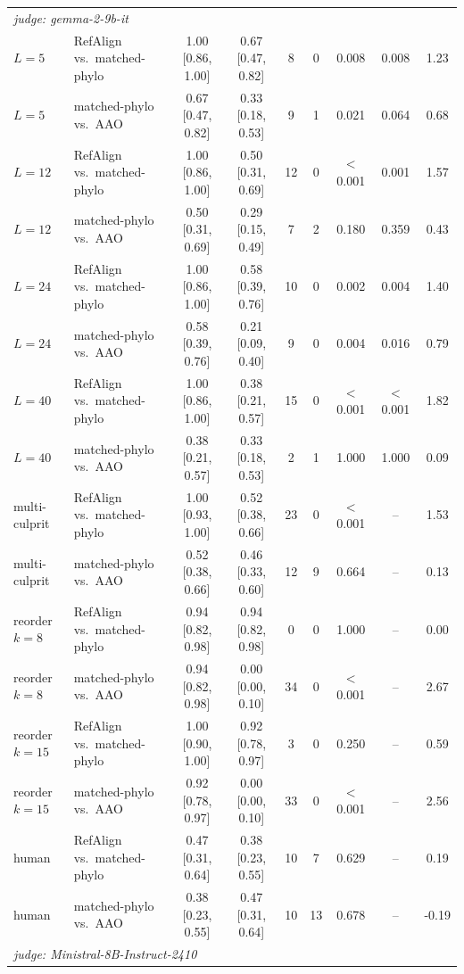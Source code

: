\begin{table}[t]
\begin{tabular}{llccccccc}
\midrule
\multicolumn{9}{l}{\emph{judge: gemma-2-9b-it}} \\
$L{=}5$ & RefAlign vs.\ matched-phylo & 1.00 [0.86, 1.00] & 0.67 [0.47, 0.82] & 8 & 0 & 0.008 & 0.008 & 1.23 \\
$L{=}5$ & matched-phylo vs.\ AAO & 0.67 [0.47, 0.82] & 0.33 [0.18, 0.53] & 9 & 1 & 0.021 & 0.064 & 0.68 \\
$L{=}12$ & RefAlign vs.\ matched-phylo & 1.00 [0.86, 1.00] & 0.50 [0.31, 0.69] & 12 & 0 & $<$0.001 & 0.001 & 1.57 \\
$L{=}12$ & matched-phylo vs.\ AAO & 0.50 [0.31, 0.69] & 0.29 [0.15, 0.49] & 7 & 2 & 0.180 & 0.359 & 0.43 \\
$L{=}24$ & RefAlign vs.\ matched-phylo & 1.00 [0.86, 1.00] & 0.58 [0.39, 0.76] & 10 & 0 & 0.002 & 0.004 & 1.40 \\
$L{=}24$ & matched-phylo vs.\ AAO & 0.58 [0.39, 0.76] & 0.21 [0.09, 0.40] & 9 & 0 & 0.004 & 0.016 & 0.79 \\
$L{=}40$ & RefAlign vs.\ matched-phylo & 1.00 [0.86, 1.00] & 0.38 [0.21, 0.57] & 15 & 0 & $<$0.001 & $<$0.001 & 1.82 \\
$L{=}40$ & matched-phylo vs.\ AAO & 0.38 [0.21, 0.57] & 0.33 [0.18, 0.53] & 2 & 1 & 1.000 & 1.000 & 0.09 \\
multi-culprit & RefAlign vs.\ matched-phylo & 1.00 [0.93, 1.00] & 0.52 [0.38, 0.66] & 23 & 0 & $<$0.001 & -- & 1.53 \\
multi-culprit & matched-phylo vs.\ AAO & 0.52 [0.38, 0.66] & 0.46 [0.33, 0.60] & 12 & 9 & 0.664 & -- & 0.13 \\
reorder $k{=}8$ & RefAlign vs.\ matched-phylo & 0.94 [0.82, 0.98] & 0.94 [0.82, 0.98] & 0 & 0 & 1.000 & -- & 0.00 \\
reorder $k{=}8$ & matched-phylo vs.\ AAO & 0.94 [0.82, 0.98] & 0.00 [0.00, 0.10] & 34 & 0 & $<$0.001 & -- & 2.67 \\
reorder $k{=}15$ & RefAlign vs.\ matched-phylo & 1.00 [0.90, 1.00] & 0.92 [0.78, 0.97] & 3 & 0 & 0.250 & -- & 0.59 \\
reorder $k{=}15$ & matched-phylo vs.\ AAO & 0.92 [0.78, 0.97] & 0.00 [0.00, 0.10] & 33 & 0 & $<$0.001 & -- & 2.56 \\
human & RefAlign vs.\ matched-phylo & 0.47 [0.31, 0.64] & 0.38 [0.23, 0.55] & 10 & 7 & 0.629 & -- & 0.19 \\
human & matched-phylo vs.\ AAO & 0.38 [0.23, 0.55] & 0.47 [0.31, 0.64] & 10 & 13 & 0.678 & -- & -0.19 \\
\midrule
\multicolumn{9}{l}{\emph{judge: Ministral-8B-Instruct-2410}} \\

\end{tabular}
\end{table}
